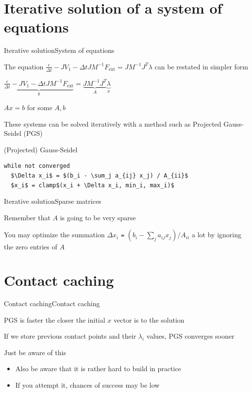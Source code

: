 \documentclass{beamer}
\begin{document}
\section{Iterative solution of a system of equations}
\begin{slide}{Iterative solution}{System of equations}{
\item The equation $\frac{\epsilon}{\Delta t} - J V_1 - \Delta t J M^{-1}F_{\text{ext}} = J M^{-1} J^T \lambda$ can be restated in simpler form
\item $\underbrace{\frac{\epsilon}{\Delta t} - J V_1 - \Delta t J M^{-1}F_{\text{ext}}}_{b} = \underbrace{J M^{-1} J^T}_{A} \underbrace{\lambda}_{x}$
\item $A x = b$ for some $A,b$
\item These systems can be solved iteratively with a method such as Projected Gauss-Seidel (PGS)
}\end{slide}

\begin{frame}[fragile]{(Projected) Gauss-Seidel}
\begin{lstlisting}[mathescape=true]
while not converged
  $\Delta x_i$ = $(b_i - \sum_j a_{ij} x_j) / A_{ii}$
  $x_i$ = clamp$(x_i + \Delta x_i, min_i, max_i)$
\end{lstlisting}
\end{frame}

\begin{slide}{Iterative solution}{Sparse matrices}{
\item Remember that $A$ is going to be very sparse
\item You may optimize the summation $\Delta x_i$ \texttt{=} $(b_i - \sum_j a_{ij} x_j) / A_{ii}$ a lot by ignoring the zero entries of $A$
}\end{slide}

\section{Contact caching}
\begin{slide}{Contact caching}{Contact caching}{
\item PGS is faster the closer the initial $x$ vector is to the solution
\item If we store previous contact points and their $\lambda_i$ values, PGS converges sooner
\item Just be aware of this
\begin{itemize}
\item Also be aware that it is rather hard to build in practice
\item If you attempt it, chances of success may be low
\end{itemize}
}\end{slide}
\end{document}
